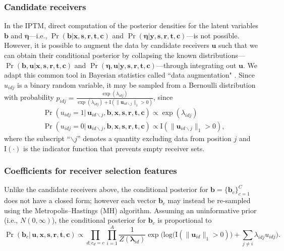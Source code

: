 \documentclass[ba]{imsart}
\numberwithin{equation}{section}
\theoremstyle{plain}
\begin{document}
	\subsubsection{Candidate receivers}
	In the IPTM, direct computation of the posterior densities for the latent variables $\boldsymbol{b}$ and $\boldsymbol{\eta}$---i.e., $\Pr(\boldsymbol{b}|\boldsymbol{x},\boldsymbol{s}, \boldsymbol{r},\boldsymbol{t}, \boldsymbol{c})$ and $\Pr(\boldsymbol{\eta}|\boldsymbol{y},\boldsymbol{s}, \boldsymbol{r},\boldsymbol{t}, \boldsymbol{c})$---is not possible. However, it is possible to augment the data by candidate receivers $\boldsymbol{u}$ such that we can obtain their conditional posterior by collapsing the known distributions---$\Pr(\boldsymbol{b}, \boldsymbol{u}|\boldsymbol{x},\boldsymbol{s}, \boldsymbol{r},\boldsymbol{t}, \boldsymbol{c})$ and $\Pr(\boldsymbol{\eta}, \boldsymbol{u}| \boldsymbol{y},\boldsymbol{s}, \boldsymbol{r},\boldsymbol{t}, \boldsymbol{c})$---through integrating out $\boldsymbol{u}$. We adapt this common tool in Bayesian statistics called ``data augmentation" \citep{tanner1987calculation,neal2015exact}. Since $u_{idj}$ is a binary random variable, it may be sampled from a Bernoulli distribution with probability $p_{idj} =\frac{\exp(\lambda_{idj})}{\exp(\lambda_{idj})+\text{I}(\lVert\boldsymbol{u}_{id\backslash j}\rVert_1 > 0 )}$, since
		\begin{equation}
				\begin{aligned}
			&\Pr(u_{idj}=1| \,\boldsymbol{u}_{id\backslash j}, \boldsymbol{b}, \boldsymbol{x},\boldsymbol{s}, \boldsymbol{r},\boldsymbol{t},\boldsymbol{c}) \propto \exp(\lambda_{idj}) \\
			&\Pr(u_{idj}=0|\, \boldsymbol{u}_{id\backslash j},\boldsymbol{b}, \boldsymbol{x},\boldsymbol{s}, \boldsymbol{r},\boldsymbol{t},\boldsymbol{c})\propto \text{I}(\lVert\boldsymbol{u}_{id\backslash j}\rVert_1 > 0 ),
		\end{aligned}
		\label{eqn:latentreceiver}
	\end{equation}
	where the subscript ``$\backslash j$'' denotes a quantity excluding data from position $j$ and $\text{I}(\cdot)$ is the indicator function that prevents empty receiver sets. 
	\subsubsection{Coefficients for receiver selection features}
	Unlike the candidate receivers above, the conditional posterior for $\boldsymbol{b}=\{\boldsymbol{b}_c\}_{c=1}^C$ does not have a closed form; however each vector $\boldsymbol{b}_c$ may instead be re-sampled using the Metropolis--Hastings (MH) algorithm. Assuming an uninformative prior (i.e., $N({0},\infty)$), the conditional posterior for $\boldsymbol{b}_c$ is proportional to~
	\begin{equation}
		\Pr(\boldsymbol{b}_c| \,\boldsymbol{u}, \boldsymbol{x}, \boldsymbol{s}, \boldsymbol{r},\boldsymbol{t},\boldsymbol{c})\propto \prod_{d:c_d=c}
		\prod_{i=1}^A \frac{1}{Z(\boldsymbol{\lambda}_{id})}\exp\Big(\mbox{log}\big(\text{I}( \lVert \boldsymbol{u}_{id}\rVert_1 > 0)\big) + \sum\limits_{j \neq i} \lambda_{idj}u_{idj}\Big).
		\label{eqn:latentedge}
	\end{equation}
\end{document}
